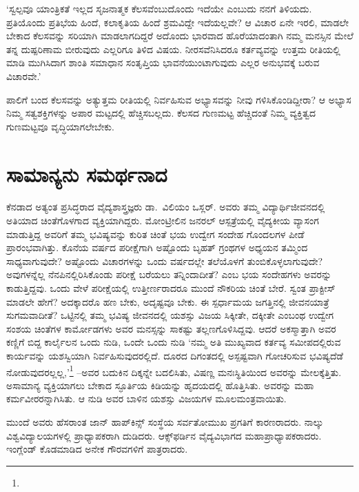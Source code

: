 ‘ಸ್ವಲ್ಪವೂ ಯಾಂತ್ರಿಕತೆ ಇಲ್ಲದ ಸೃಜನಾತ್ಮಕ ಕೆಲಸವೆಂಬುದೊಂದು ಇದೆಯೇ ಎಂಬುದು ನನಗೆ ತಿಳಿಯದು. ಪ್ರತಿಯೊಂದು ಪ್ರತಿಭೆಯ ಹಿಂದೆ, ಕಲಾಕೃತಿಯ ಹಿಂದೆ ಶ್ರಮವಿದ್ದೇ ಇದೆ\-ಯಲ್ಲವೇ? ಆ ವಿಚಾರ ಏನೇ ಇರಲಿ, ಮಾಡಲೇ ಬೇಕಾದ ಕೆಲಸವನ್ನು ಸರಿಯಾಗಿ ಮಾಡಲಾಗದಿದ್ದರೆ ಅದೊಂದು ಭಾರವಾದ ಹೊರೆಯಾದಂತಾಗಿ ನಮ್ಮ ಮನಸ್ಸಿನ ಮೇಲೆ ತನ್ನ ದುಷ್ಪರಿಣಾಮ ಬೀರುವುದು ಎಲ್ಲರಿಗೂ ತಿಳಿದ ವಿಷಯ. ನೀರಸವೆನಿಸಿದರೂ ಕರ್ತವ್ಯವನ್ನು ಉತ್ತಮ ರೀತಿಯಲ್ಲಿ ಮಾಡಿ ಮುಗಿಸಿದಾಗ ಶಾಂತಿ ಸಮಾಧಾನ ಸಂತೃಪ್ತಿಯ ಭಾವನೆಯುಂಟಾಗುವುದು ಎಲ್ಲರ ಅನುಭವಕ್ಕೆ ಬರುವ ವಿಚಾರವೇ.’

ಪಾಲಿಗೆ ಬಂದ ಕೆಲಸವನ್ನು ಅತ್ಯುತ್ತಮ ರೀತಿಯಲ್ಲಿ ನಿರ್ವಹಿಸುವ ಅಭ್ಯಾಸವನ್ನು ನೀವು ಗಳಿಸಿಕೊಂಡಿದ್ದೀರಾ? ಆ ಅಭ್ಯಾಸ ನಿಮ್ಮ ಸತ್ವಶಕ್ತಿಗಳನ್ನು ಅಪಾರ ಮಟ್ಟದಲ್ಲಿ ಹೆಚ್ಚಿಸಬಲ್ಲದು. ಕೆಲಸದ ಗುಣಮಟ್ಟ ಹೆಚ್ಚಿದಂತೆ ನಿಮ್ಮ ವ್ಯಕ್ತಿತ್ವದ ಗುಣಮಟ್ಟವೂ ವೃದ್ಧಿಯಾಗಲೇಬೇಕು.


\section*{ಸಾಮಾನ್ಯನು ಸಮರ್ಥನಾದ}


ಕೆನಡಾದ ಅತ್ಯಂತ ಪ್ರಸಿದ್ಧರಾದ ವೈದ್ಯಶಾಸ್ತ್ರಜ್ಞರು ಡಾ.\ ವಿಲಿಯಂ ಒಸ್ಲರ್. ಅವರು ತಮ್ಮ ವಿದ್ಯಾರ್ಥಿಜೀವನದಲ್ಲಿ ಅತಿಯಾದ ಚಿಂತೆಗೊಳಗಾದ ವ್ಯಕ್ತಿಯಾಗಿದ್ದರು. ಮೋಂಟ್ರೀಲಿನ ಜನರಲ್ ಆಸ್ಪತ್ರೆಯಲ್ಲಿ ವೈದ್ಯಕೀಯ ವ್ಯಾಸಂಗ ಮಾಡುತ್ತಿದ್ದ ಅವರಿಗೆ ತಮ್ಮ ಭವಿಷ್ಯವನ್ನು ಕುರಿತ ಚಿಂತೆ ಭಯ ಉದ್ವೇಗ ಸಂದೇಹ ಗೊಂದಲಗಳ ಪೀಡೆ ಪ್ರಾರಂಭವಾಗಿತ್ತು. ಕೊನೆಯ ವರ್ಷದ ಪರೀಕ್ಷೆಗಾಗಿ ಅಷ್ಟೊಂದು ಬೃಹತ್ ಗ್ರಂಥಗಳ ಅಧ್ಯಯನ ತಮ್ಮಿಂದ ಸಾಧ್ಯವಾಗುವುದೇ? ಅಷ್ಟೊಂದು ವಿಚಾರಗಳನ್ನು ಒಂದು ವರ್ಷದಲ್ಲೇ ತಲೆಯೊಳಗೆ ತುಂಬಿಕೊಳ್ಳಲಾಗುವುದೇ? ಅವುಗಳನ್ನೆಲ್ಲ ನೆನಪಿನಲ್ಲಿರಿಸಿಕೊಂಡು ಪರೀಕ್ಷೆ ಬರೆಯಲು ತನ್ನಿಂದಾದೀತೆ? ಎಂಬ ಭಯ ಸಂದೇಹಗಳು ಅವರನ್ನು ಕಾಡುತ್ತಿದ್ದವು. ಒಂದು ವೇಳೆ ಪರೀಕ್ಷೆಯಲ್ಲಿ ಉತ್ತೀರ್ಣರಾದರೂ ಮುಂದೆ ನೌಕರಿಯ ಚಿಂತೆ ಬೇರೆ. ಸ್ವಂತ ಪ್ರಾಕ್ಟೀಸ್ ಮಾಡಲೇ ಹೇಗೆ? ಅದಕ್ಕಾದರೊ ಹಣ ಬೇಕು, ಅದೃಷ್ಟವೂ ಬೇಕು. ಈ ಸ್ಪರ್ಧಾಮಯ ಜಗತ್ತಿನಲ್ಲಿ ಜೀವನಯಾತ್ರೆ ಸುಗಮವಾದೀತೆ? ಒಟ್ಟಿನಲ್ಲಿ ತಮ್ಮ ಭವಿಷ್ಯ ಜೀವನದಲ್ಲಿ ಯಶಸ್ಸು ವಿಜಯ ಸಿಕ್ಕೀತೇ, ದಕ್ಕೀತೇ ಎಂಬಂಥ ಉದ್ವೇಗ ಸಂಶಯ ಚಿಂತೆಗಳ ಕಾರ್ಮೋಡಗಳು ಅವರ ಮನಸ್ಸನ್ನು ಸಾಕಷ್ಟು ತಲ್ಲಣಗೊಳಿಸಿದ್ದವು. ಆದರೆ ಅಕಸ್ಮಾತ್ತಾಗಿ ಅವರ ಕಣ್ಣಿಗೆ ಬಿದ್ದ ಕಾರ್ಲೈಲನ ಒಂದು ನುಡಿ, ಒಂದೇ ಒಂದು ನುಡಿ ‘ನಮ್ಮ ಅತಿ ಮುಖ್ಯವಾದ ಕರ್ತವ್ಯ ಸಮೀಪದಲ್ಲಿರುವ ಕಾರ್ಯವನ್ನು ಯಶಸ್ವಿಯಾಗಿ ನಿರ್ವಹಿಸುವುದರಲ್ಲಿದೆ. ದೂರದ ದಿಗಂತದಲ್ಲಿ ಅಸ್ಪಷ್ಟವಾಗಿ ಗೋಚರಿಸುವ ಭವಿಷ್ಯದೆಡೆ ನೋಡುವುದರಲ್ಲಲ್ಲ,’\footnote{\hfill{}} –ಅವರ ಬದುಕಿನ ದಿಕ್ಕನ್ನೇ ಬದಲಿಸಿತು, ವಿಷಣ್ಣ ಮನಃಸ್ಥಿತಿಯಿಂದ ಅವರನ್ನು ಮೇಲಕ್ಕೆತ್ತಿತು. ಅಸಾಮಾನ್ಯ ವ್ಯಕ್ತಿಯಾಗಲು ಬೇಕಾದ ಸ್ಫೂರ್ತಿಯ ಕಿಡಿಯನ್ನು ಹೃದಯದಲ್ಲಿ ಹೊತ್ತಿಸಿತು. ಅವರನ್ನು ಮಹಾ ಕರ್ಮವೀರರನ್ನಾಗಿಸಿತು. ಆ ನುಡಿ ಅವರ ಬಾಳಿನ ಯಶಸ್ಸು ವಿಜಯಗಳ ಮೂಲಮಂತ್ರವಾಯಿತು.

ಮುಂದೆ ಅವರು ಹೆಸರಾಂತ ಜಾನ್ ಹಾಪ್​ಕಿನ್ಸ್ ಸಂಸ್ಥೆಯ ಸರ್ವತೋಮುಖ ಪ್ರಗತಿಗೆ ಕಾರಣರಾದರು. ನಾಲ್ಕು ವಿಶ್ವವಿದ್ಯಾಲಯಗಳಲ್ಲಿ ಪ್ರಾಧ್ಯಾಪಕರಾಗಿ ದುಡಿದರು. ಆಕ್ಸ್​ಫರ್ಡಿನ ವೈದ್ಯವಿಭಾಗದ ಮಹಾಪ್ರಾಧ್ಯಾಪಕರಾದರು. ಇಂಗ್ಲೆಂಡ್ ಕೊಡಮಾಡಿದ ಅನೇಕ ಗೌರವಗಳಿಗೆ ಪಾತ್ರರಾದರು.

